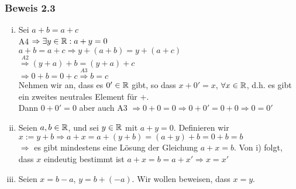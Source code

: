 \begin{enumerate}
\subsubsection*{Beweis 2.3}
\begin{enumerate}[i)]
\item Sei $a+b=a+c$\\ A4 $\Rightarrow\exists y\in\mathbb{R}:a+y=0$\\$a+b=a+c\Rightarrow y+(a+b)=y+(a+c)$\\$\mathop  \Rightarrow \limits^{A2} (y+a)+b=(y+a)+c$\\$\Rightarrow 0+b=0+c \mathop  \Rightarrow \limits^{A3} b=c$\\
Nehmen wir an, dass es $0'\in\mathbb{R}$ gibt, so dass $x+0'=x$, $\forall x\in\mathbb{R}$, d.h. es gibt ein zweites neutrales Element für $+$.\\

\noindent Dann $0+0'=0$ aber auch A3 $\Rightarrow 0+0=0\Rightarrow 0+0'=0+0\Rightarrow 0=0'$
\item Seien $a,b\in\mathbb{R}$, und sei $y\in\mathbb{R}$ mit $a+y=0$. Definieren wir $x:=y+b\Rightarrow a+x=a+(y+b)=(a+y)+b=0+b=b$\\
$\Rightarrow$ es gibt mindestens eine Lösung der Gleichung $a+x=b$. Von i) folgt, dass $x$ eindeutig bestimmt ist $a+x=b=a+x' \Rightarrow x=x'$
\item Seien $x=b-a$, $y=b+(-a)$. Wir wollen beweisen, dass $x=y$.\\


\end{enumerate}
\end{enumerate}
